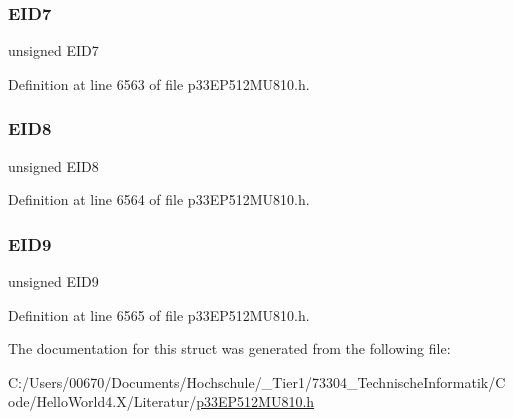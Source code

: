 \subsubsection{\texorpdfstring{E\+I\+D7}{EID7}}
{\footnotesize\ttfamily unsigned E\+I\+D7}



Definition at line 6563 of file p33\+E\+P512\+M\+U810.\+h.

\mbox{\label{structtag_c2_r_x_f6_e_i_d_b_i_t_s_acca25e0b7d86eb499d01f85222baea87}} 
\subsubsection{\texorpdfstring{E\+I\+D8}{EID8}}
{\footnotesize\ttfamily unsigned E\+I\+D8}



Definition at line 6564 of file p33\+E\+P512\+M\+U810.\+h.

\mbox{\label{structtag_c2_r_x_f6_e_i_d_b_i_t_s_ac6748f73d4ada8538b06548be4f396c2}} 
\subsubsection{\texorpdfstring{E\+I\+D9}{EID9}}
{\footnotesize\ttfamily unsigned E\+I\+D9}



Definition at line 6565 of file p33\+E\+P512\+M\+U810.\+h.



The documentation for this struct was generated from the following file\+:\begin{DoxyCompactItemize}
\item 
C\+:/\+Users/00670/\+Documents/\+Hochschule/\+\_\+\+Tier1/73304\+\_\+\+Technische\+Informatik/\+Code/\+Hello\+World4.\+X/\+Literatur/\hyperlink{p33_e_p512_m_u810_8h}{p33\+E\+P512\+M\+U810.\+h}\end{DoxyCompactItemize}
